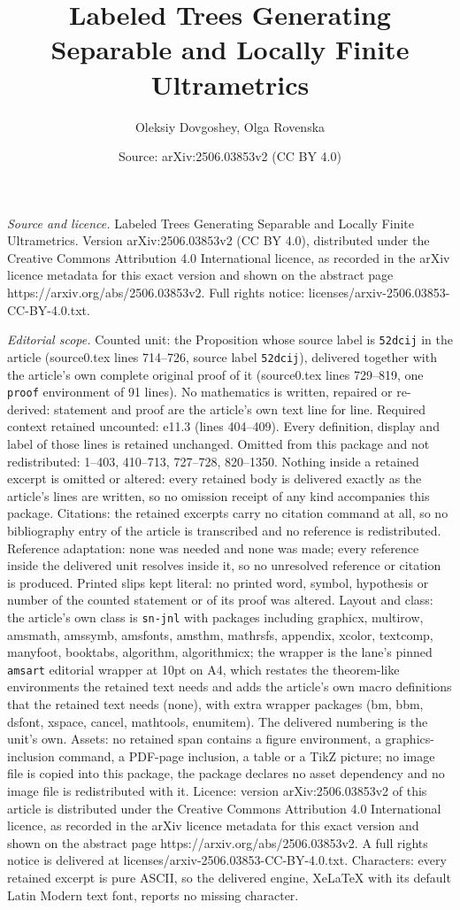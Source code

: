 \documentclass[10pt,a4paper]{amsart}
\title[Labeled Trees Generating Separable and Locally Finite Ultram]{Labeled Trees Generating Separable and Locally Finite Ultrametrics}
\author{Oleksiy Dovgoshey, Olga Rovenska}
\date{Source: arXiv:2506.03853v2 (CC BY 4.0)}
\begin{document}
\maketitle

\noindent\emph{Source and licence.} Labeled Trees Generating Separable and Locally Finite Ultrametrics. Version arXiv:2506.03853v2 (CC BY 4.0), distributed under the Creative Commons Attribution 4.0 International licence, as recorded in the arXiv licence metadata for this exact version and shown on the abstract page https://arxiv.org/abs/2506.03853v2. Full rights notice: licenses/arxiv-2506.03853-CC-BY-4.0.txt.\par\smallskip

\noindent\textit{Editorial scope.} Counted unit: the Proposition whose source label is \texttt{52dcij} in the article (source0.tex lines 714--726, source label \texttt{52dcij}), delivered together with the article's own complete original proof of it (source0.tex lines 729--819, one \texttt{proof} environment of 91 lines). No mathematics is written, repaired or re-derived: statement and proof are the article's own text line for line. Required context retained uncounted: e11.3 (lines 404--409). Every definition, display and label of those lines is retained unchanged. Omitted from this package and not redistributed: 1--403, 410--713, 727--728, 820--1350. Nothing inside a retained excerpt is omitted or altered: every retained body is delivered exactly as the article's lines are written, so no omission receipt of any kind accompanies this package. Citations: the retained excerpts carry no citation command at all, so no bibliography entry of the article is transcribed and no reference is redistributed. Reference adaptation: none was needed and none was made; every reference inside the delivered unit resolves inside it, so no unresolved reference or citation is produced. Printed slips kept literal: no printed word, symbol, hypothesis or number of the counted statement or of its proof was altered. Layout and class: the article's own class is \texttt{sn-jnl} with packages including graphicx, multirow, amsmath, amssymb, amsfonts, amsthm, mathrsfs, appendix, xcolor, textcomp, manyfoot, booktabs, algorithm, algorithmicx; the wrapper is the lane's pinned \texttt{amsart} editorial wrapper at 10pt on A4, which restates the theorem-like environments the retained text needs and adds the article's own macro definitions that the retained text needs (none), with extra wrapper packages (bm, bbm, dsfont, xspace, cancel, mathtools, enumitem). The delivered numbering is the unit's own. Assets: no retained span contains a figure environment, a graphics-inclusion command, a PDF-page inclusion, a table or a TikZ picture; no image file is copied into this package, the package declares no asset dependency and no image file is redistributed with it. Licence: version arXiv:2506.03853v2 of this article is distributed under the Creative Commons Attribution 4.0 International licence, as recorded in the arXiv licence metadata for this exact version and shown on the abstract page https://arxiv.org/abs/2506.03853v2. A full rights notice is delivered at licenses/arxiv-2506.03853-CC-BY-4.0.txt. Characters: every retained excerpt is pure ASCII, so the delivered engine, XeLaTeX with its default Latin Modern text font, reports no missing character.
\end{document}
